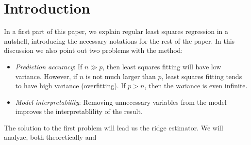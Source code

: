 \section{Introduction}
In a first part of this paper, we explain regular least squares regression in a nutshell, introducing the necessary notations for the rest of the paper. In this discussion we also point out two problems with the method:
\begin{itemize}
    \item \textit{Prediction accuracy}: If $n \gg p$, then least squares fitting will have low variance. However, if $n$ is not much larger than $p$, least squares fitting tends to have high variance (overfitting). If $p > n$, then the variance is even infinite.
    \item \textit{Model interpretability}: Removing unnecessary variables from the model improves the interpretablility of the result.
\end{itemize}
The solution to the first problem will lead us the ridge estimator. We will analyze, both theoretically and 